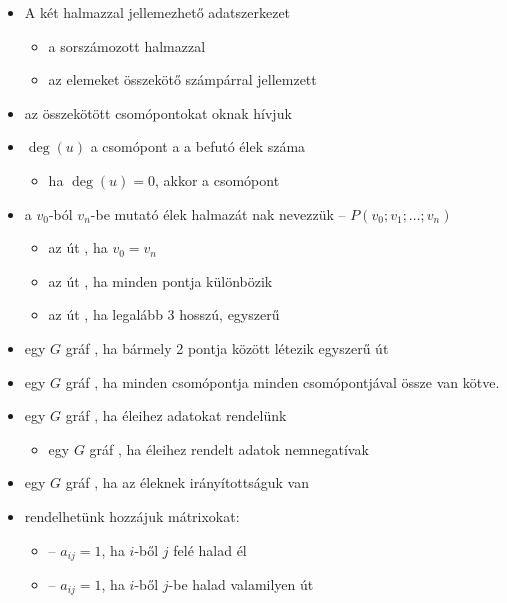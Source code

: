\documentclass[main.tex]{subfiles}
\begin{document}
  \begin{itemize}
    \item A  két halmazzal jellemezhető adatszerkezet
    \begin{itemize}
      \item a  sorszámozott halmazzal
      
      \item az elemeket összekötő számpárral jellemzett
    \end{itemize}

    \item az összekötött csomópontokat oknak hívjuk
    
    \item $\deg(u)$ a csomópont a a befutó élek száma
    \begin{itemize}
      \item ha $\deg(u) = 0$, akkor a csomópont 
    \end{itemize}

    \item a $v_0$-ból $v_n$-be mutató élek halmazát
    nak nevezzük – $P \left( v_0; v_1; \dots ;v_n \right)$
    \begin{itemize}
      \item az út , ha $v_0 = v_n$
      \item az út , ha minden pontja különbözik
      \item az út , ha legalább 3 hosszú, egyszerű
    \end{itemize}

    \item egy $G$ gráf ,
    ha bármely 2 pontja között létezik egyszerű út

    \item egy $G$ gráf ,
    ha minden csomópontja minden csomópontjával össze van kötve.

    \item egy $G$ gráf ,
    ha éleihez adatokat rendelünk
    \begin{itemize}
      \item egy $G$ gráf ,
      ha éleihez rendelt adatok nemnegatívak
    \end{itemize}

    \item egy $G$ gráf ,
    ha az éleknek irányítottságuk van

    \item rendelhetünk hozzájuk mátrixokat:
    \begin{itemize}
      \item {} – $a_{ij} = 1$,
      ha $i$-ből $j$ felé halad él 
      
      \item {} – $a_{ij} = 1$,
      ha $i$-ből $j$-be halad valamilyen út 
    \end{itemize}
  \end{itemize}  
\end{document}
